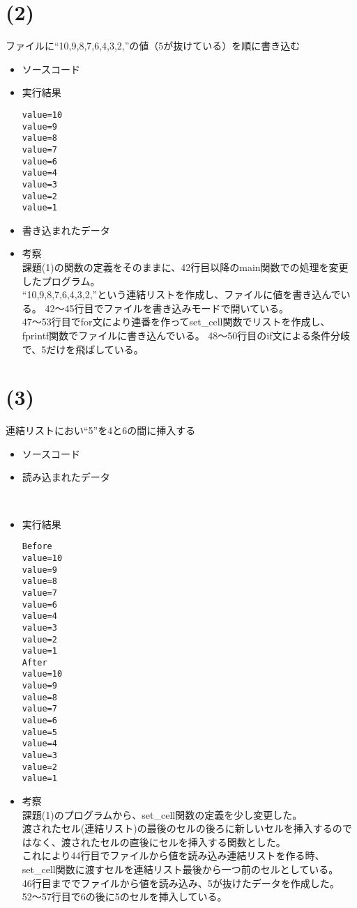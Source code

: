 \documentclass[a4paper]{jsarticle}
\begin{document}
\section*{(2)}
	ファイルに``10,9,8,7,6,4,3,2,''の値（5が抜けている）を順に書き込む
	\begin{itemize}
	\item ソースコード
		 
		\mbox{}\newline
	\item 実行結果
		\begin{lstlisting}
value=10
value=9
value=8
value=7
value=6
value=4
value=3
value=2
value=1
		\end{lstlisting}
		\mbox{}\newline
	\item 書き込まれたデータ
		 
		\mbox{}\newline
	\item 考察\mbox{}\\
		課題(1)の関数の定義をそのままに、42行目以降のmain関数での処理を変更したプログラム。\\
		``10,9,8,7,6,4,3,2,''という連結リストを作成し、ファイルに値を書き込んでいる。
		42〜45行目でファイルを書き込みモードで開いている。\\
		47〜53行目でfor文により連番を作ってset\_cell関数でリストを作成し、fprintf関数でファイルに書き込んでいる。
		48〜50行目のif文による条件分岐で、5だけを飛ばしている。
	\end{itemize}

\section*{(3)}
	連結リストにおい``5''を4と6の間に挿入する
	\begin{itemize}
	\item ソースコード
		 
		\mbox{}\newline
	\item 読み込まれたデータ
		 
		\mbox{}\newline \\
	\item 実行結果
		\begin{lstlisting}
Before
value=10
value=9
value=8
value=7
value=6
value=4
value=3
value=2
value=1
After
value=10
value=9
value=8
value=7
value=6
value=5
value=4
value=3
value=2
value=1
		\end{lstlisting}
		\mbox{}\newline
	\item 考察\mbox{}\\
		課題(1)のプログラムから、set\_cell関数の定義を少し変更した。\\
		渡されたセル(連結リスト)の最後のセルの後ろに新しいセルを挿入するのではなく、渡されたセルの直後にセルを挿入する関数とした。\\
		これにより44行目でファイルから値を読み込み連結リストを作る時、set\_cell関数に渡すセルを連結リスト最後から一つ前のセルとしている。\\
		46行目まででファイルから値を読み込み、5が抜けたデータを作成した。
		52〜57行目で6の後に5のセルを挿入している。
	\end{itemize}
\end{document}
